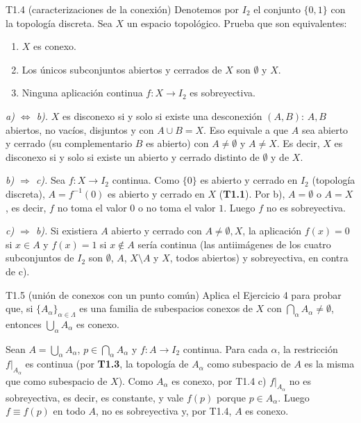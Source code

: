 \begin{ejercicio}{T1.4 (caracterizaciones de la conexión)}
Denotemos por $I_2$ el conjunto $\{0,1\}$ con la topología discreta. Sea $X$ un espacio topológico. Prueba que son equivalentes:
\begin{enumerate}
    \item[a)] $X$ es conexo.
    \item[b)] Los únicos subconjuntos abiertos y cerrados de $X$ son $\emptyset$ y $X$.
    \item[c)] Ninguna aplicación continua $f \colon X \to I_2$ es sobreyectiva.
\end{enumerate}

\sol \fuentepropia

\emph{a) $\Leftrightarrow$ b).} $X$ es disconexo si y solo si existe una desconexión $(A,B)$: $A,B$ abiertos, no vacíos, disjuntos y con $A \cup B = X$. Eso equivale a que $A$ sea abierto y cerrado (su complementario $B$ es abierto) con $A \neq \emptyset$ y $A \neq X$. Es decir, $X$ es disconexo si y solo si existe un abierto y cerrado distinto de $\emptyset$ y de $X$.

\emph{b) $\Rightarrow$ c).} Sea $f \colon X \to I_2$ continua. Como $\{0\}$ es abierto y cerrado en $I_2$ (topología discreta), $A = f^{-1}(0)$ es abierto y cerrado en $X$ (\textbf{T1.1}). Por b), $A = \emptyset$ o $A = X$, es decir, $f$ no toma el valor $0$ o no toma el valor $1$. Luego $f$ no es sobreyectiva.

\emph{c) $\Rightarrow$ b).} Si existiera $A$ abierto y cerrado con $A \neq \emptyset, X$, la aplicación $f(x) = 0$ si $x \in A$ y $f(x) = 1$ si $x \notin A$ sería continua (las antiimágenes de los cuatro subconjuntos de $I_2$ son $\emptyset$, $A$, $X \setminus A$ y $X$, todos abiertos) y sobreyectiva, en contra de c).
\end{ejercicio}

\begin{ejercicio}{T1.5 (unión de conexos con un punto común)}
Aplica el Ejercicio 4 para probar que, si $\{A_\alpha\}_{\alpha \in \Lambda}$ es una familia de subespacios conexos de $X$ con $\bigcap_{\alpha} A_\alpha \neq \emptyset$, entonces $\bigcup_{\alpha} A_\alpha$ es conexo.

\sol \fuentepropia

Sean $A = \bigcup_\alpha A_\alpha$, $p \in \bigcap_\alpha A_\alpha$ y $f \colon A \to I_2$ continua. Para cada $\alpha$, la restricción $f|_{A_\alpha}$ es continua (por \textbf{T1.3}, la topología de $A_\alpha$ como subespacio de $A$ es la misma que como subespacio de $X$). Como $A_\alpha$ es conexo, por T1.4 c) $f|_{A_\alpha}$ no es sobreyectiva, es decir, es constante, y vale $f(p)$ porque $p \in A_\alpha$. Luego $f \equiv f(p)$ en todo $A$, no es sobreyectiva y, por T1.4, $A$ es conexo.
\end{ejercicio}

